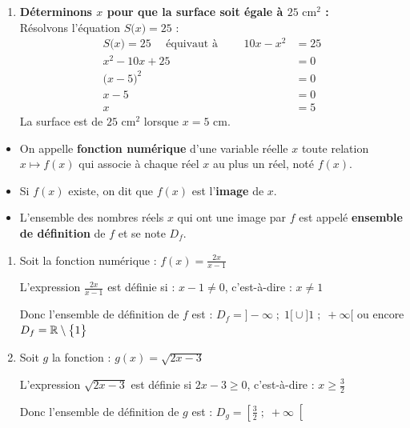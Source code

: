 \documentclass[10pt, a4paper]{article}
\begin{document}
\begin{Solution}[ACTIVITÉ][1]
\begin{enumerate}[leftmargin=*,itemsep=0.5pt]
    \item \textbf{Déterminons $x$ pour que la surface soit égale à $25\text{ cm}^2$ :} \\
    Résolvons l'équation $S\big( x \big) = 25$ :
   \begin{align*}
    S\big( x \big) = 25 \quad \text{ équivaut à } \qquad 10x - x^2 &= 25 \\
     x^2 - 10x + 25 &= 0 \\
     \big( x - 5 \big)^2 &= 0 \\
     x - 5 &= 0 \\
     x &= 5
    \end{align*}
        La surface est de $25\text{ cm}^2$ lorsque $x = 5\text{ cm}$.
\end{enumerate}
\end{Solution}

\begin{Definition}[]
\begin{itemize}[leftmargin=*,itemsep=0.5pt]
    \item On appelle \textbf{fonction numérique} d'une variable réelle $x$ toute relation $x \mapsto f(x)$ qui associe à chaque réel $x$ au plus un réel, noté $f(x)$.
    \item Si $f(x)$ existe, on dit que $f(x)$ est l'\textbf{image} de $x$.
    \item L'ensemble des nombres réels $x$ qui ont une image par $f$ est appelé \textbf{ensemble de définition} de $f$ et se note $D_f$.
\end{itemize}
\end{Definition}

\begin{Exemple}[][10 min]
\begin{enumerate}[leftmargin=*,itemsep=0.5pt]
    \item Soit la fonction numérique : $f(x) = \frac{2x}{x-1}$

    L'expression $\frac{2x}{x-1}$ est définie si : $x - 1 \neq 0$, 
    c'est-à-dire : $x \neq 1$ 
    
     Donc l'ensemble de définition de $f$ est : \quad $D_f = \big]-\infty \;;\; 1\big[ \cup \big]1 \;;\; +\infty\big[$ \quad ou encore \quad $D_f = \mathbb{R} \setminus \big\{1\big\}$

    \item Soit $g$ la fonction : $g(x) = \sqrt{2x - 3}$

    L'expression $\sqrt{2x - 3}$ est définie si $2x - 3 \geq 0$, 
    c'est-à-dire : $x \geq \frac{3}{2}$

    Donc l'ensemble de définition de $g$ est : 
    $D_g = \left[\frac{3}{2} \;;\; +\infty\right[$
\end{enumerate}
\end{Exemple}
\end{document}

